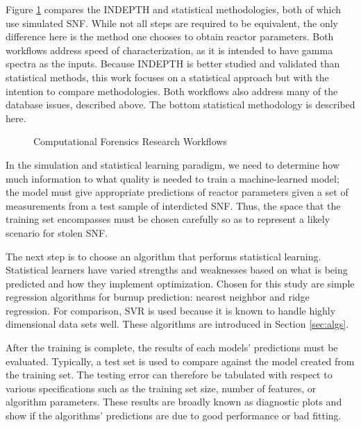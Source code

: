 Figure \ref{fig:compworkflow} compares the \gls{INDEPTH} and statistical
methodologies, both of which use simulated \gls{SNF}.  While not all steps are
required to be equivalent, the only difference here is the method one chooses
to obtain reactor parameters. Both workflows address speed of characterization,
as it is intended to have gamma spectra as the inputs.  Because \gls{INDEPTH}
is better studied and validated than statistical methods,  this work
focuses on a statistical approach but with the intention to compare
methodologies.  Both workflows also address many of the database issues,
described above. The bottom statistical methodology is described here.
\\
\begin{figure}[!tbh]
  \caption{Computational Forensics Research Workflows}
  \label{fig:compworkflow}
\end{figure}

In the simulation and statistical learning paradigm, we need to determine how
much information to what quality is needed to train a machine-learned model;
the model must give appropriate predictions of reactor parameters given a set
of measurements from a test sample of interdicted \gls{SNF}. Thus, the space 
that the training set encompasses must be chosen carefully so as to represent 
a likely scenario for stolen \gls{SNF}.

The next step is to choose an algorithm that performs statistical learning.
Statistical learners have varied strengths and weaknesses based on what is
being predicted and how they implement optimization.  Chosen for this study are
simple regression algorithms for burnup prediction: nearest neighbor and ridge
regression.  For comparison, \gls{SVR} is used because it is known to handle
highly dimensional data sets well.  These algorithms are introduced in Section
\ref{sec:algs}.

After the training is complete, the results of each models' predictions must be
evaluated.  Typically, a test set is used to compare against the model created
from the training set.  The testing error can therefore be tabulated with
respect to various specifications such as the training set size, number of
features, or algorithm parameters. These results are broadly known as
diagnostic plots and show if the algorithms' predictions are due to good
performance or bad fitting. 

